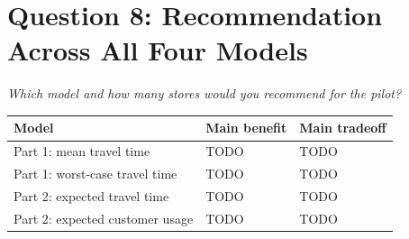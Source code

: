 \documentclass{article}
\newcommand{\question}[1]{\par\medskip\noindent\textit{#1}\par\smallskip}
\begin{document}
\section*{Question 8: Recommendation Across All Four Models}
\question{Which model and how many stores would you recommend for the pilot?}
\begin{center}
\small
\begin{tabular}{@{}p{}p{}p{}@{}}
\toprule
\textbf{Model} & \textbf{Main benefit} & \textbf{Main tradeoff} \\
\midrule
Part 1: mean travel time & TODO & TODO \\
Part 1: worst-case travel time & TODO & TODO \\
Part 2: expected travel time & TODO & TODO \\
Part 2: expected customer usage & TODO & TODO \\
\bottomrule
\end{tabular}
\end{center}

\end{document}
